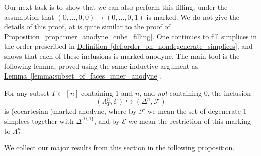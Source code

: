 \documentclass[main.tex]{subfiles}
\begin{document}
Our next task is to show that we can also perform this filling, under the assumption that $(0, \ldots, 0, 0) \to (0, \ldots, 0, 1)$ is marked. We do not give the details of this proof, at is quite similar to the proof of \hyperref[prop:inner_anodyne_cube_filling]{Proposition~\ref*{prop:inner_anodyne_cube_filling}}. One continues to fill simplices in the order prescribed in \hyperref[def:order_on_nondegenerate_simplices]{Definition~\ref*{def:order_on_nondegenerate_simplices}}, and shows that each of these inclusions is marked anodyne. The main tool is the following lemma, proved using the same inductive argument as \hyperref[lemma:subset_of_faces_inner_anodyne]{Lemma~\ref*{lemma:subset_of_faces_inner_anodyne}}.

\begin{lemma}
  \label{lemma:subset_of_faces_marked_anodyne}
  For any subset $T \subset [n]$ containing 1 and $n$, and \emph{not} containing 0, the inclusion
  \begin{equation*}
    (\Lambda^{n}_{T}, \mathcal{E}) \hookrightarrow (\Delta^{n}, \mathcal{F})
  \end{equation*}
  is (cocartesian-)marked anodyne, where by $\mathcal{F}$ we mean the set of degenerate $1$-simplces together with $\Delta^{\{0, 1\}}$, and by $\mathcal{E}$ we mean the restriction of this marking to $\Lambda^{n}_{T}$.
\end{lemma}

We collect our major results from this section in the following proposition.
\end{document}
